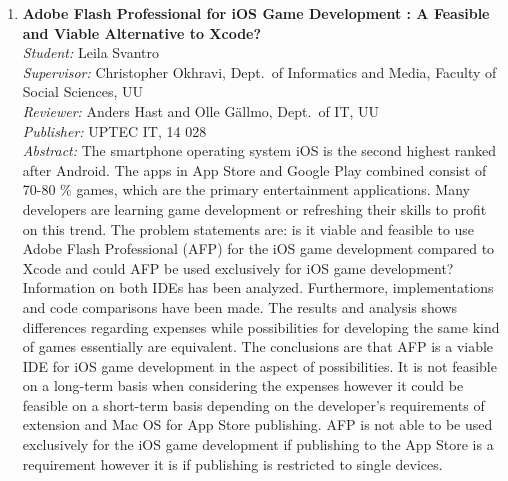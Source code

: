 \begin{small}
\begin{enumerate}
\item\textbf{Adobe Flash Professional for iOS Game Development : A Feasible and Viable Alternative to Xcode?}\\
  \emph{Student:} Leila Svantro\\
  \emph{Supervisor:} Christopher Okhravi, Dept.~of Informatics and Media,  Faculty of Social Sciences, UU\\
  \emph{Reviewer:} Anders Hast and Olle G\"{a}llmo, Dept.~of IT, UU\\
  \emph{Publisher:} UPTEC IT, 14 028\\
  \emph{Abstract:} The smartphone operating system iOS is the second highest ranked after Android. The apps in App Store and Google Play combined consist of 70-80 \% games, which are the primary entertainment applications. Many developers are learning game development or refreshing their skills to profit on this trend. The problem statements are: is it viable and feasible to use Adobe Flash Professional (AFP) for the iOS game development compared to Xcode and could AFP be used exclusively for iOS game development? Information on both IDEs has been analyzed. Furthermore, implementations and code comparisons have been made. The results and analysis shows differences regarding expenses while possibilities for developing the same kind of games essentially are equivalent. The conclusions are that AFP is a viable IDE for iOS game development in the aspect of possibilities. It is not feasible on a long-term basis when considering the expenses however it could be feasible on a short-term basis depending on the developer's requirements of extension and Mac OS for App Store publishing. AFP is not able to be used exclusively for the iOS game development if publishing  to the App Store is a requirement however it is if publishing  is restricted to single devices.


\end{enumerate}
\end{small}
